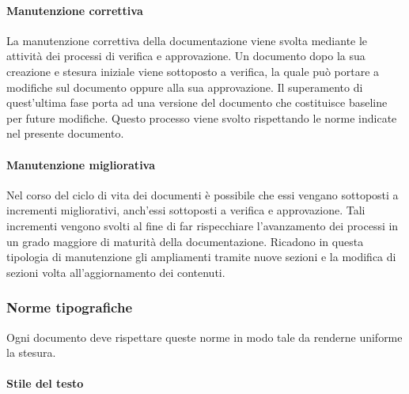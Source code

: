 \paragraph{Manutenzione correttiva}
La manutenzione correttiva della documentazione viene svolta mediante le attività dei processi di verifica e approvazione. Un documento dopo la sua creazione e stesura iniziale viene sottoposto a verifica, la quale può portare a modifiche sul documento oppure alla sua approvazione.
Il superamento di quest'ultima fase porta ad una versione del documento che costituisce baseline per future modifiche. Questo processo viene svolto rispettando le norme indicate nel presente documento.
\paragraph{Manutenzione migliorativa}
Nel corso del ciclo di vita dei documenti è possibile che essi vengano sottoposti a incrementi migliorativi, anch'essi sottoposti a verifica e approvazione. Tali incrementi vengono svolti al fine di far rispecchiare l'avanzamento dei processi in un grado maggiore di maturità della documentazione. Ricadono in questa tipologia di manutenzione gli ampliamenti tramite nuove sezioni e la modifica di sezioni volta all'aggiornamento dei contenuti.

\subsubsection{Norme tipografiche}
Ogni documento deve rispettare queste norme in modo tale da renderne uniforme la stesura.

\paragraph{Stile del testo}

